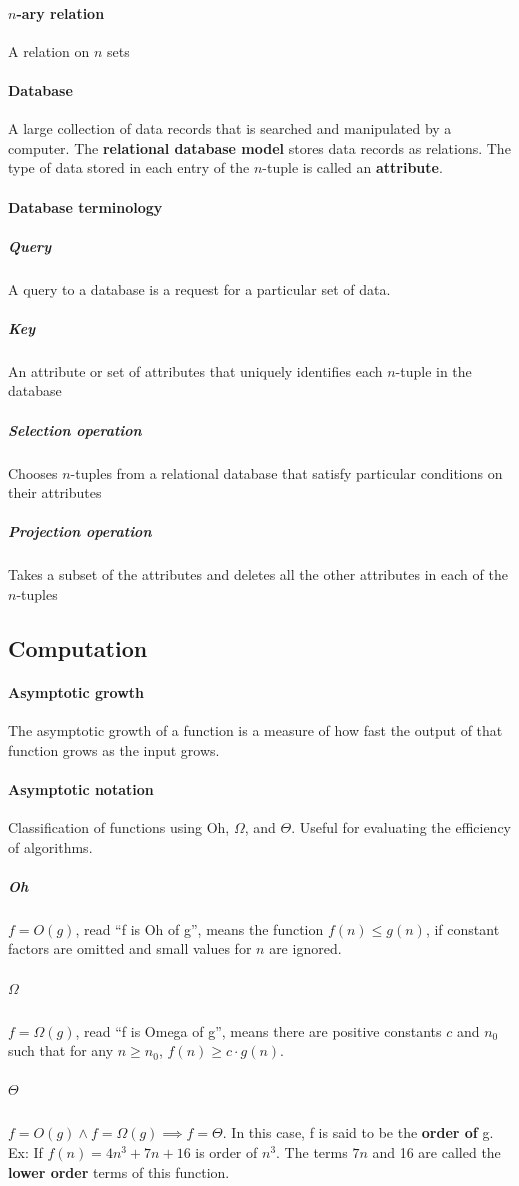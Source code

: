 \documentclass[a4paper]{article}
\begin{document}
\paragraph{$n$-ary relation} A relation on $n$ sets
\paragraph{Database} A large collection of data records that is searched and manipulated by a computer. The \textbf{relational database model} stores data records as relations. The type of data stored in each entry of the $n$-tuple is called an \textbf{attribute}. 
\paragraph{Database terminology}
\subparagraph{Query} A query to a database is a request for a particular set of data.
\subparagraph{Key} An attribute or set of attributes that uniquely identifies each $n$-tuple in the database
\subparagraph{Selection operation} Chooses $n$-tuples from a relational database that satisfy particular conditions on their attributes
\subparagraph{Projection operation} Takes a subset of the attributes and deletes all the other attributes in each of the $n$-tuples
\pagebreak

\subsection{Computation}
\paragraph{Asymptotic growth} The asymptotic growth of a function is a measure of how fast the output of that function grows as the input grows. 
\paragraph{Asymptotic notation} Classification of functions using Oh, $\Omega$, and $\Theta$. Useful for evaluating the efficiency of algorithms.
\subparagraph{Oh} $f = O(g)$, read ``f is Oh of g'', means the function $f(n) \leq g(n)$, if constant factors are omitted and small values for $n$ are ignored.
\subparagraph{$\Omega$} $f = \Omega (g)$, read ``f is Omega of g'', means there are positive constants $c$ and $n_0$ such that for any $n \geq n_0$, $f(n) \geq c \cdot g(n)$.
\subparagraph{$\Theta$} $f = O(g) \land f = \Omega (g) \implies f = \Theta$. In this case, f is said to be the \textbf{order of} g. Ex: If $f(n) = 4n^3 + 7n + 16$ is order of $n^3$. The terms $7n$ and 16 are called the \textbf{lower order} terms of this function.
\end{document}
